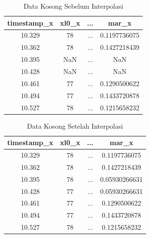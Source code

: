 \begin{longtable}{|c|c|c|c|}
  \caption{Data Kosong Sebelum Interpolasi}
  \label{tb:NaNdata}                                                       \\
  \hline
  \rowcolor[HTML]{C0C0C0}
  \textbf{timestamp\_x} & \textbf{xl0\_x} & \textbf{...} & \textbf{mar\_x} \\
  \hline
  10.329                & 78              & ...          & 0.1197736075    \\
  10.362                & 78              & ...          & 0.1427218439    \\
  10.395                & NaN             & ...          & NaN             \\
  10.428                & NaN             & ...          & NaN             \\
  10.461                & 77              & ...          & 0.1290500622    \\
  10.494                & 77              & ...          & 0.1433720878    \\
  10.527                & 78              & ...          & 0.1215658232    \\
  \hline
\end{longtable}

\begin{longtable}{|c|c|c|c|}
  \caption{Data Kosong Setelah Interpolasi}
  \label{tb:noNaNdata}                                                     \\
  \hline
  \rowcolor[HTML]{C0C0C0}
  \textbf{timestamp\_x} & \textbf{xl0\_x} & \textbf{...} & \textbf{mar\_x} \\
  \hline
  10.329                & 78              & ...          & 0.1197736075    \\
  10.362                & 78              & ...          & 0.1427218439    \\
  10.395                & 78              & ...          & 0.05930266631   \\
  10.428                & 77              & ...          & 0.05930266631   \\
  10.461                & 77              & ...          & 0.1290500622    \\
  10.494                & 77              & ...          & 0.1433720878    \\
  10.527                & 78              & ...          & 0.1215658232    \\
  \hline
\end{longtable}



